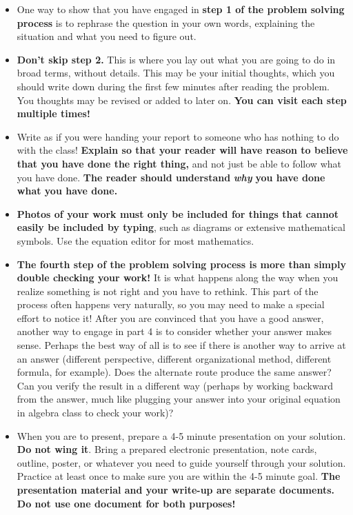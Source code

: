 \begin{itemize}
	\item One way to show that you have engaged in \textbf{step 1 of the problem solving process} is to rephrase the question in your own words, explaining the situation and what you need to figure out.
	\item \textbf{Don't skip step 2.} This is where you lay out what you are going to do in broad terms, without details. This may be your initial thoughts, which you should write down during the first few minutes after reading the problem. You thoughts may be revised or added to later on. \textbf{You can visit each step multiple times!}
	\item Write as if you were handing your report to someone who has nothing to do with the class! \textbf{Explain so that your reader will have reason to believe that you have done the right thing,} and not just be able to follow what you have done. \textbf{The reader should understand }\textbf{\textit{\large{}why}}\textbf{ you have done what you have done.}
	\item \textbf{Photos of your work must only be included for things that cannot easily be included by typing}, such as diagrams or extensive mathematical symbols. Use the equation editor for most mathematics.
	\item \textbf{The fourth step of the problem solving process is more than simply double checking your work!} It is what happens along the way when you realize something is not right and you have to rethink. This part of the process often happens very naturally, so you may need to make a special effort to notice it! After you are convinced that you have a good answer, another way to engage in part 4 is to consider whether your answer makes sense. Perhaps the best way of all is to see if there is another way to arrive at an answer (different perspective, different organizational method, different formula, for example). Does the alternate route produce the same answer? Can you verify the result in a different way (perhaps by working backward from the answer, much like plugging your answer into your original equation in algebra class to check your work)?
	\item When you are to present, prepare a 4-5 minute presentation on your solution. \textbf{Do not wing it}. Bring a prepared electronic presentation, note cards, outline, poster, or whatever you need to guide yourself through your solution. Practice at least once to make sure you are within the 4-5 minute goal. \textbf{The presentation material and your write-up are separate documents. Do not use one document for both purposes!}
\end{itemize}

